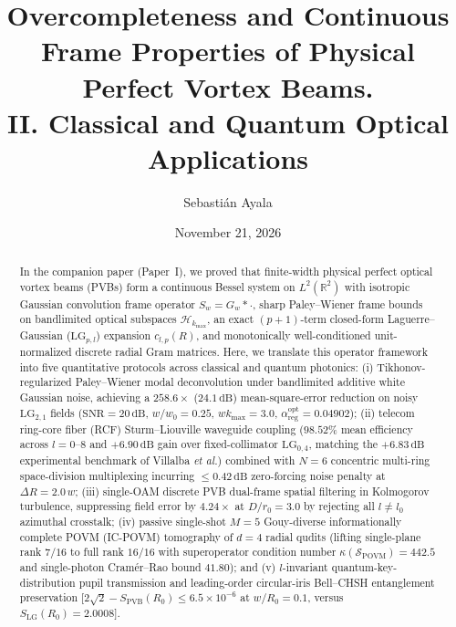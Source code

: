 \documentclass[aps,pra,onecolumn,notitlepage,11pt,tightenlines,nofootinbib,floatfix,longbibliography]{revtex4-2}
\begin{document}
\title{Overcompleteness and Continuous Frame Properties of Physical Perfect Vortex Beams.\\II. Classical and Quantum Optical Applications}

\author{Sebasti\'an Ayala}

\date{November 21, 2026}

\begin{abstract}
In the companion paper (Paper~I), we proved that finite-width physical perfect optical vortex beams (PVBs) form a continuous Bessel system on $L^2(\mathbb{R}^2)$ with isotropic Gaussian convolution frame operator $S_w = G_w * \cdot$, sharp Paley--Wiener frame bounds on bandlimited optical subspaces $\mathcal{H}_{k_{\max}}$, an exact $(p+1)$-term closed-form Laguerre--Gaussian ($\mathrm{LG}_{p,l}$) expansion $c_{l,p}(R)$, and monotonically well-conditioned unit-normalized discrete radial Gram matrices. Here, we translate this operator framework into five quantitative protocols across classical and quantum photonics: (i) Tikhonov-regularized Paley--Wiener modal deconvolution under bandlimited additive white Gaussian noise, achieving a $258.6\times$ ($24.1\,\mathrm{dB}$) mean-square-error reduction on noisy $\mathrm{LG}_{2,1}$ fields ($\mathrm{SNR} = 20\,\mathrm{dB}$, $w/w_0 = 0.25$, $w k_{\max} = 3.0$, $\alpha_{\mathrm{reg}}^{\mathrm{opt}} = 0.04902$); (ii) telecom ring-core fiber (RCF) Sturm--Liouville waveguide coupling ($98.52\%$ mean efficiency across $l = 0\text{--}8$ and $+6.90\,\mathrm{dB}$ gain over fixed-collimator $\mathrm{LG}_{0,4}$, matching the $+6.83\,\mathrm{dB}$ experimental benchmark of Villalba \emph{et al.}) combined with $N = 6$ concentric multi-ring space-division multiplexing incurring $\le 0.42\,\mathrm{dB}$ zero-forcing noise penalty at $\Delta R = 2.0\,w$; (iii) single-OAM discrete PVB dual-frame spatial filtering in Kolmogorov turbulence, suppressing field error by $4.24\times$ at $D/r_0 = 3.0$ by rejecting all $l \neq l_0$ azimuthal crosstalk; (iv) passive single-shot $M = 5$ Gouy-diverse informationally complete POVM (IC-POVM) tomography of $d = 4$ radial qudits (lifting single-plane rank $7/16$ to full rank $16/16$ with superoperator condition number $\kappa(\mathcal{S}_{\mathrm{POVM}}) = 442.5$ and single-photon Cram\'er--Rao bound $41.80$); and (v) $l$-invariant quantum-key-distribution pupil transmission and leading-order circular-iris Bell--CHSH entanglement preservation [$2\sqrt{2} - S_{\mathrm{PVB}}(R_0) \le 6.5\times 10^{-6}$ at $w/R_0 = 0.1$, versus $S_{\mathrm{LG}}(R_0) = 2.0008$].
\end{abstract}
\end{document}
